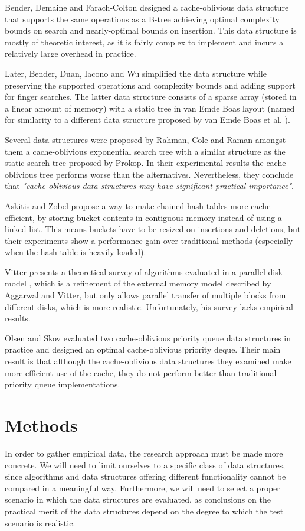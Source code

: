 \documentclass{acm_proc_article-sp}
\begin{document}
Bender, Demaine and Farach-Colton designed a cache-oblivious data structure that supports the same operations as a B-tree \cite{bender2005cob} achieving optimal complexity bounds on search and nearly-optimal bounds on insertion. This data structure is mostly of theoretic interest, as it is fairly complex to implement and incurs a relatively large overhead in practice.

Later, Bender, Duan, Iacono and Wu simplified the data structure \cite{bender2004lpc} while preserving the supported operations and complexity bounds and adding support for finger searches. The latter data structure consists of a sparse array (stored in a linear amount of memory) with a static tree in van Emde Boas layout (named for similarity to a different data structure proposed by van Emde Boas et al. \cite{vanemdeboas1976dai}).

Several data structures were proposed by Rahman, Cole and Raman \cite{rahman2001opd} amongst them a cache-oblivious exponential search tree with a similar structure as the static search tree proposed by Prokop. In their experimental results the cache-oblivious tree performs worse than the alternatives. Nevertheless, they conclude that \textit{"cache-obli\-vious data structures may have significant practical importance"}.

Askitis and Zobel \cite{askitis2005ccc} propose a way to make chained hash tables more cache-efficient, by storing bucket contents in contiguous memory instead of using a linked list. This means buckets have to be resized on insertions and deletions, but their experiments show a performance gain over traditional methods (especially when the hash table is heavily loaded).

Vitter presents a theoretical survey of algorithms evaluated in a parallel disk model \cite{vitter2001ema}, which is a refinement of the external memory model described by Aggarwal and Vitter, but only allows parallel transfer of multiple blocks from different disks, which is more realistic. Unfortunately, his survey lacks empirical results.

Olsen and Skov evaluated two cache-oblivious priority queue data structures in practice \cite{olsen2002coa} and designed an optimal cache-obli\-vious priority deque. Their main result is that although the cache-obli\-vious data structures they examined make more efficient use of the cache, they do not perform better than traditional priority queue implementations.

\section{Methods}
In order to gather empirical data, the research approach must be made more concrete. We will need to limit ourselves to a specific class of data structures, since algorithms and data structures offering different functionality cannot be compared in a meaningful way. Furthermore, we will need to select a proper scenario in which the data structures are evaluated, as conclusions on the practical merit of the data structures depend on the degree to which the test scenario is realistic.
\end{document}
